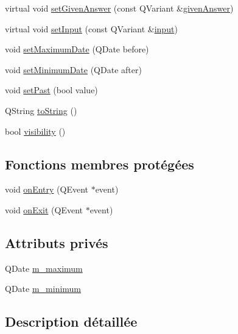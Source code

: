 \begin{DoxyCompactItemize}
\item 
virtual void \hyperlink{classSH__QuestionState_a8fec0a91aed0b2b1699db17169873eb0}{set\-Given\-Answer} (const Q\-Variant \&\hyperlink{classSH__QuestionState_a29cdea8bc55e39e3ed02d24743c30f8c}{given\-Answer})
\item 
virtual void \hyperlink{classSH__QuestionState_ab40b6202090d1afcc965e124b2deb88a}{set\-Input} (const Q\-Variant \&\hyperlink{classSH__InOutState_a8e1b78069343122df7713624a1a5a100}{input})
\item 
void \hyperlink{classSH__DateQuestionState_a43fd05c32a82342a25ea860f25917253}{set\-Maximum\-Date} (Q\-Date before)
\item 
void \hyperlink{classSH__DateQuestionState_a28dba9f895682e7722c1a245e0aac713}{set\-Minimum\-Date} (Q\-Date after)
\item 
void \hyperlink{classSH__DateQuestionState_a6f376c24355deb573b3132d18cf50341}{set\-Past} (bool value)
\item 
Q\-String \hyperlink{classSH__GenericState_a7779babbb40f3f8faa71112204d9804f}{to\-String} ()
\item 
bool \hyperlink{classSH__InOutState_a3a18752c4122c26a2ebf38310c9c1b75}{visibility} ()
\end{DoxyCompactItemize}
\subsection*{Fonctions membres protégées}
\begin{DoxyCompactItemize}
\item 
void \hyperlink{classSH__GenericState_a68c67ef95738e01cd34cd5926f4932fb}{on\-Entry} (Q\-Event $\ast$event)
\item 
void \hyperlink{classSH__GenericState_a7f7863859318c70c9b734be5bf5510b0}{on\-Exit} (Q\-Event $\ast$event)
\end{DoxyCompactItemize}
\subsection*{Attributs privés}
\begin{DoxyCompactItemize}
\item 
Q\-Date \hyperlink{classSH__DateQuestionState_a9cb25c158f1622cf65b868c2bbab7e30}{m\-\_\-maximum}
\item 
Q\-Date \hyperlink{classSH__DateQuestionState_a9b4c46cf566ae037d816e1d6b66c777b}{m\-\_\-minimum}
\end{DoxyCompactItemize}


\subsection{Description détaillée}


